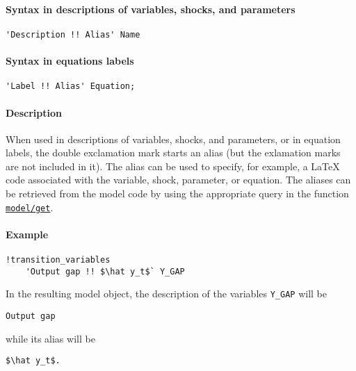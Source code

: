 


	\paragraph{Syntax in descriptions of variables, shocks, and
parameters}\label{syntax-in-descriptions-of-variables-shocks-and-parameters}

\begin{verbatim}
'Description !! Alias' Name
\end{verbatim}

\paragraph{Syntax in equations labels}\label{syntax-in-equations-labels}

\begin{verbatim}
'Label !! Alias' Equation;
\end{verbatim}

\paragraph{Description}\label{description}

When used in descriptions of variables, shocks, and parameters, or in
equation labels, the double exclamation mark starts an alias (but the
exlamation marks are not included in it). The alias can be used to
specify, for example, a LaTeX code associated with the variable, shock,
parameter, or equation. The aliases can be retrieved from the model code
by using the appropriate query in the function
\href{model/get}{\texttt{model/get}}.

\paragraph{Example}\label{example}

\begin{verbatim}
!transition_variables
    'Output gap !! $\hat y_t$` Y_GAP
\end{verbatim}

In the resulting model object, the description of the variables
\texttt{Y\_GAP} will be

\begin{verbatim}
Output gap
\end{verbatim}

while its alias will be

\begin{verbatim}
$\hat y_t$.
\end{verbatim}


